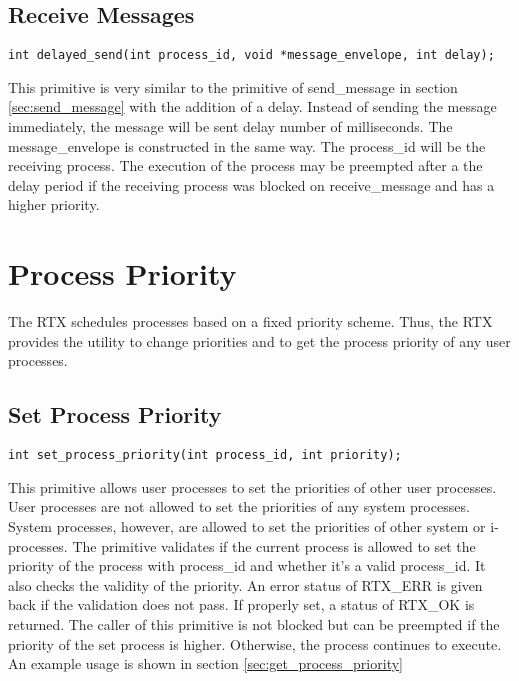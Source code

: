 \documentclass[12pt]{report}
\begin{document}
\subsection{Receive Messages}
\begin{lstlisting}
int delayed_send(int process_id, void *message_envelope, int delay);
\end{lstlisting}

\par This primitive is very similar to the primitive of send\_message in section \ref{sec:send_message} with the addition of a delay. Instead of sending the message immediately, the message will be sent delay number of milliseconds. The message\_envelope is constructed in the same way. The process\_id will be the receiving process. The execution of the process may be preempted after a the delay period if the receiving process was blocked on receive\_message and has a higher priority.

\section{Process Priority}
\par The RTX schedules processes based on a fixed priority scheme. Thus, the RTX provides the utility to change priorities and to get the process priority of any user processes.

\subsection{Set Process Priority}
\label{sec:set_process_priority}
\begin{lstlisting}
int set_process_priority(int process_id, int priority);
\end{lstlisting}

This primitive allows user processes to set the priorities of other user processes. User processes are not allowed to set the priorities of any system processes. System processes, however, are allowed to set the priorities of other system or i-processes. The primitive validates if the current process is allowed to set the priority of the process with process\_id and whether it's a valid process\_id. It also checks the validity of the priority. An error status of RTX\_ERR is given back if the validation does not pass. If properly set, a status of RTX\_OK is returned. The caller of this primitive is not blocked but can be preempted if the priority of the set process is higher. Otherwise, the process continues to execute. An example usage is shown in section \ref{sec:get_process_priority}
\end{document}
